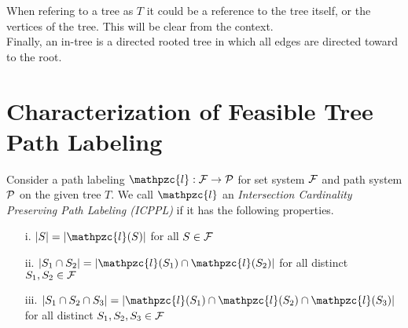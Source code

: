\documentclass{llncs}
\def\cA{{\cal A}}
\def\cF{{\cal F}}
\def\cP{{\cal P}}
\def\cl{\mathpzc{l}}
\begin{document}
\noindent
When refering to a tree as $T$ it could be a reference to the tree
itself, or the vertices of the tree. This will be clear from the
context.\\

\noindent
Finally, an in-tree is a directed rooted tree in which all edges are
directed toward to the root.

\section{Characterization of Feasible Tree Path  Labeling} 
\label{feasible} 


Consider a path labeling $\cl: \cF \rightarrow \cP$ for set system $\cF$
and path system $\cP$ on the given tree $T$. We
call $\cl$ an {\em Intersection Cardinality Preserving Path Labeling
  (ICPPL)} if it has the following properties.

\begin{enumerate}
\item [i.]  $|S| = |\cl(S)|$ for all $S \in \cF$
\item [ii.] $|S_1 \cap S_2| = |\cl(S_1) \cap \cl(S_2)|$ for all
  distinct $S_1, S_2 \in \cF$
\item [iii.] $|S_1 \cap S_2 \cap S_3| = |\cl(S_1) \cap \cl(S_2) \cap
  \cl(S_3)|$ for all distinct  $S_1, S_2, S_3 \in \cF$
\end{enumerate}


\end{document}
